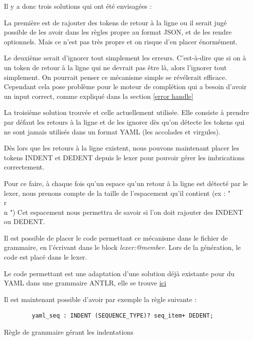\documentclass[
    iict, %
    il, %
]{heig-tb}
\begin{document}
Il y a donc trois solutions qui ont été envisagées :

La première est de rajouter des tokens de retour à la ligne ou il serait jugé possible de les avoir dans les règles propre au format JSON, et de les rendre optionnels.
Mais ce n'est pas très propre et on risque d'en placer énormément.

Le deuxième serait d'ignorer tout simplement les erreurs.  C'est-à-dire que si on à un token de retour à la ligne qui ne devrait pas être là, alors l'ignorer tout simplement.
On pourrait penser ce mécanisme simple se révélerait efficace. Cependant cela pose problème pour le moteur de complétion qui a besoin d'avoir un input correct, comme expliqué dans la section \ref{error handle}

La troisième solution trouvée et celle actuellement utilisée. Elle consiste à prendre par défaut les retours à la ligne et de les ignorer dès qu'on détecte les tokens
qui ne sont jamais utilisés dans un format YAML (les accolades et virgules).

Dès lors que les retours à la ligne existent, nous pouvons maintenant placer les tokens INDENT et DEDENT depuis le lexer
pour pouvoir gérer les imbrications correctement.

Pour ce faire, à chaque fois qu'un espace qu'un retour à la ligne est détecté par le lexer, nous prenons compte de la taille de l'espacement qu'il contient (ex : "\\r\\n    ")
Cet espacement nous permettra de savoir si l'on doit rajouter des INDENT ou DEDENT.

Il est possible de placer le code permettant ce mécanisme dans le fichier de grammaire, en l'écrivant dans le block \emph{lexer:@member{}}.
Lors de la génération, le code est placé dans le lexer.

Le code permettant est une adaptation d'une solution déjà existante pour du YAML dans une grammaire ANTLR, elle se trouve \href{https://github.com/umaranis/FastYaml}{ici}

Il est maintenant possible d'avoir par exemple la règle suivante :

\begin{listing}[!ht]
    \begin{verbatim}
        yaml_seq : INDENT (SEQUENCE_TYPE)? seq_item+ DEDENT;
    \end{verbatim}
    \caption{Règle de grammaire gérant les indentations}
    \label{ex-indentation-rule}
\end{listing}
\end{document}
